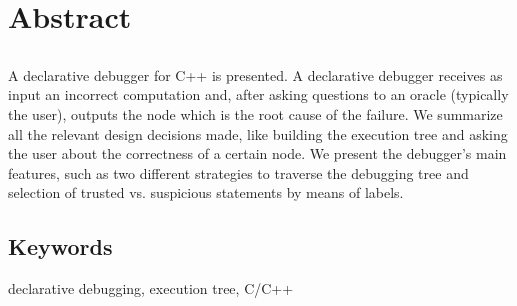 \chapter*{Abstract}

\section*{\tituloPortadaEngVal}

A declarative debugger for C++ is presented. A declarative debugger receives as input an incorrect computation and, after asking questions to an oracle (typically the user), outputs the node which is the root cause of the failure. We summarize all the relevant design decisions made, like building the execution tree and asking the user about the correctness of a certain node. We present the debugger’s main features, such as two different strategies to traverse the debugging tree and selection of trusted vs. suspicious statements by means of labels.

\section*{Keywords}

\noindent declarative debugging, execution tree, C/C++



